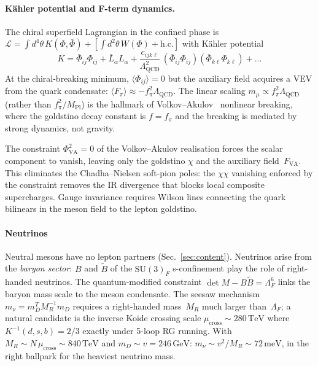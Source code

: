 \documentclass[aps,prd,twocolumn,showpacs,preprintnumbers,superscriptaddress]{revtex4-2}
\newcommand{\SU}{\mathrm{SU}}
\newcommand{\GeV}{\,\mathrm{GeV}}
\newcommand{\TeV}{\,\mathrm{TeV}}
\newcommand{\Lqcd}{\Lambda_{\mathrm{QCD}}}
\begin{document}
\paragraph{K\"ahler potential and F-term dynamics.}

The chiral superfield Lagrangian in the confined phase is
$\mathcal{L} = \int d^4\theta\,K(\Phi,\bar\Phi)
+ [\int d^2\theta\,W(\Phi) + \text{h.c.}]$ with K\"ahler
potential
\begin{equation}
  K = \bar\Phi_{ij}\Phi_{ij} + \bar L_\alpha L_\alpha
  + \frac{c_{ijk\ell}}{\Lqcd^2}\,
  (\bar\Phi_{ij}\Phi_{ij})(\bar\Phi_{k\ell}\Phi_{k\ell})
  + \ldots
  \label{eq:kahler}
\end{equation}
At the chiral-breaking minimum, $\langle\Phi_{ij}\rangle = 0$
but the auxiliary field acquires a VEV from the quark
condensate:
$\langle F_\pi\rangle \approx -f_\pi^2\Lqcd$.
The linear scaling $m_\mu \propto f_\pi^2\Lqcd$ (rather than
$f_\pi^2/M_{\mathrm{Pl}}$) is the hallmark of
Volkov--Akulov~\cite{VolkovAkulov:1973} nonlinear breaking,
where the goldstino decay constant is $f = f_\pi$ and the
breaking is mediated by strong dynamics, not gravity.

The constraint $\Phi_{\mathrm{VA}}^2 = 0$ of the
Volkov--Akulov realisation forces the scalar component
to vanish, leaving only the goldstino $\chi$ and the
auxiliary field~$F_{\mathrm{VA}}$.
This eliminates the Chadha--Nielsen soft-pion poles:
the $\chi\chi$ vanishing enforced by the constraint removes
the IR divergence that blocks local composite supercharges.
Gauge invariance requires Wilson lines connecting the quark
bilinears in the meson field to the lepton goldstino.

\paragraph{Neutrinos}
\label{sec:neutrinos}

Neutral mesons have no lepton partners
(Sec.~\ref{sec:content}).  Neutrinos arise from the
\emph{baryon sector}: $B$ and $\tilde B$ of the
$\SU(3)_F$ s-confinement play the role of right-handed
neutrinos.
The quantum-modified constraint
$\det M - B\tilde B = \Lambda_F^6$ links the baryon mass
scale to the meson condensate.
The seesaw mechanism $m_\nu = m_D^T M_R^{-1} m_D$
requires a right-handed mass~$M_R$ much larger than~$\Lambda_F$;
a natural candidate is the inverse Koide crossing scale
$\mu_{\mathrm{cross}} \sim 280\TeV$ where
$K^{-1}(d,s,b) = 2/3$ exactly under 5-loop RG running.
With $M_R \sim N\,\mu_{\mathrm{cross}} \sim 840\TeV$
and $m_D \sim v = 246\GeV$:
$m_\nu \sim v^2/M_R \sim 72\,\mathrm{meV}$,
in the right ballpark for the heaviest neutrino mass.
\end{document}
